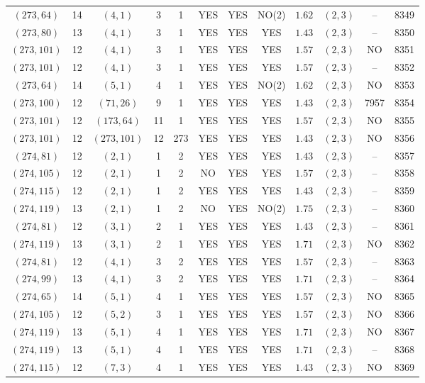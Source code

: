 \begin{longtable}{|c|c|c|c|c|c|c|c|c|c|c|c|}
$(273,64)$ & 14 & $(4,1)$ & 3 & 1 & YES & YES & NO(2) & $1.62$ & $(2,3)$ & -- & 8349\\
$(273,80)$ & 13 & $(4,1)$ & 3 & 1 & YES & YES & YES & $1.43$ & $(2,3)$ & -- & 8350\\
$(273,101)$ & 12 & $(4,1)$ & 3 & 1 & YES & YES & YES & $1.57$ & $(2,3)$ & NO & 8351\\
$(273,101)$ & 12 & $(4,1)$ & 3 & 1 & YES & YES & YES & $1.57$ & $(2,3)$ & -- & 8352\\
$(273,64)$ & 14 & $(5,1)$ & 4 & 1 & YES & YES & NO(2) & $1.62$ & $(2,3)$ & NO & 8353\\
$(273,100)$ & 12 & $(71,26)$ & 9 & 1 & YES & YES & YES & $1.43$ & $(2,3)$ & 7957 & 8354\\
$(273,101)$ & 12 & $(173,64)$ & 11 & 1 & YES & YES & YES & $1.57$ & $(2,3)$ & NO & 8355\\
$(273,101)$ & 12 & $(273,101)$ & 12 & 273 & YES & YES & YES & $1.43$ & $(2,3)$ & NO & 8356\\
$(274,81)$ & 12 & $(2,1)$ & 1 & 2 & YES & YES & YES & $1.43$ & $(2,3)$ & -- & 8357\\
$(274,105)$ & 12 & $(2,1)$ & 1 & 2 & NO & YES & YES & $1.57$ & $(2,3)$ & -- & 8358\\
$(274,115)$ & 12 & $(2,1)$ & 1 & 2 & YES & YES & YES & $1.43$ & $(2,3)$ & -- & 8359\\
$(274,119)$ & 13 & $(2,1)$ & 1 & 2 & NO & YES & NO(2) & $1.75$ & $(2,3)$ & -- & 8360\\
$(274,81)$ & 12 & $(3,1)$ & 2 & 1 & YES & YES & YES & $1.43$ & $(2,3)$ & -- & 8361\\
$(274,119)$ & 13 & $(3,1)$ & 2 & 1 & YES & YES & YES & $1.71$ & $(2,3)$ & NO & 8362\\
$(274,81)$ & 12 & $(4,1)$ & 3 & 2 & YES & YES & YES & $1.57$ & $(2,3)$ & -- & 8363\\
$(274,99)$ & 13 & $(4,1)$ & 3 & 2 & YES & YES & YES & $1.71$ & $(2,3)$ & -- & 8364\\
$(274,65)$ & 14 & $(5,1)$ & 4 & 1 & YES & YES & YES & $1.57$ & $(2,3)$ & NO & 8365\\
$(274,105)$ & 12 & $(5,2)$ & 3 & 1 & YES & YES & YES & $1.57$ & $(2,3)$ & NO & 8366\\
$(274,119)$ & 13 & $(5,1)$ & 4 & 1 & YES & YES & YES & $1.71$ & $(2,3)$ & NO & 8367\\
$(274,119)$ & 13 & $(5,1)$ & 4 & 1 & YES & YES & YES & $1.71$ & $(2,3)$ & -- & 8368\\
$(274,115)$ & 12 & $(7,3)$ & 4 & 1 & YES & YES & YES & $1.43$ & $(2,3)$ & NO & 8369\\

\end{longtable}
